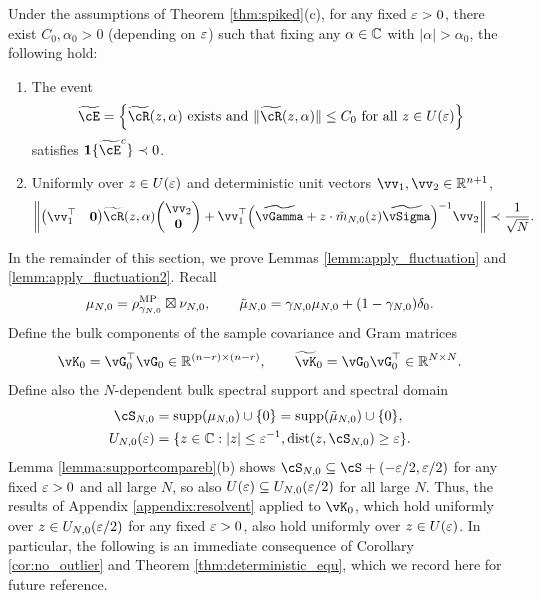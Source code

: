 \begin{lemma}\label{lemm:apply_fluctuation2}
Under the assumptions of Theorem \ref{thm:spiked}(c), for any fixed $\varepsilon>0$, there
exist $C_0,\alpha_0>0$ (depending on $\varepsilon$) such that fixing any $\alpha \in
\mathbb{C}$ with $|\alpha|>\alpha_0$, the following hold:
\begin{enumerate}[label=(\alph*)]
\item The event
\[\widetilde \cE=\Big\{\widetilde \vcR(z,\alpha) \text{ exists and } \|\widetilde \vcR(z,\alpha)\| \leq C_0
\text{ for all } z \in U(\eps)\Big\}\]
satisfies $\bI\{\widetilde \cE^c\} \prec 0$.
\item Uniformly over $z \in U(\varepsilon)$ and
deterministic unit vectors $\vv_1,\vv_2\in\R^{n+1}$,
\begin{align}
		\norm{   \begin{pmatrix}
			\vv_1^\top&\mathbf{0}
		\end{pmatrix}\widetilde \vcR(z,\alpha)\begin{pmatrix}
			\vv_2\\
			\mathbf{0}
		\end{pmatrix}+
\vv_1^\top \left(\widetilde\vGamma+z\cdot\tilde{m}_{N,0}(z)\widetilde\vSigma
\right)^{-1}\vv_2 } \prec \frac{1}{\sqrt{N}}.
\end{align}
\end{enumerate}
\end{lemma}

In the remainder of this section, we prove Lemmas \ref{lemm:apply_fluctuation}
and \ref{lemm:apply_fluctuation2}. Recall 
\[\mu_{N,0}=\rho_{\gamma_{N,0}}^{\textnormal{MP}} \boxtimes\nu_{N,0}, \qquad
\tilde \mu_{N,0}=\gamma_{N,0}\mu_{N,0}+(1-\gamma_{N,0})\delta_0.\]
Define the bulk components of the sample covariance and Gram matrices
\begin{equation}\label{eq:K0def}
\vK_0=\vG_0^\top \vG_0 \in \R^{(n-r) \times (n-r)},
\qquad \widetilde \vK_0=\vG_0\vG_0^\top \in \R^{N \times N}.
\end{equation}
Define also the $N$-dependent bulk spectral support and spectral domain
\begin{align}
\cS_{N,0}&=\supp{\mu_{N,0}} \cup \{0\}
=\supp{\tilde\mu_{N,0}} \cup \{0\},\nonumber\\
U_{N,0}(\eps)&=\{z \in \C:|z| \leq \eps^{-1},\dist{z,\cS_{N,0}} \geq \eps\}.\label{eq:UN0}
\end{align}
Lemma \ref{lemma:supportcompareb}(b) shows
$\cS_{N,0} \subseteq \cS+(-\eps/2,\eps/2)$ for any fixed $\varepsilon>0$ and all large $N$,
so also $U(\varepsilon) \subseteq U_{N,0}(\varepsilon/2)$ for all large $N$. Thus, the results of
Appendix \ref{appendix:resolvent} applied to $\vK_0$, which hold uniformly over
$z \in U_{N,0}(\varepsilon/2)$ for any fixed $\varepsilon>0$,
also hold uniformly over $z \in U(\varepsilon)$. In particular,
the following is an immediate consequence of Corollary \ref{cor:no_outlier} and
Theorem \ref{thm:deterministic_equ},
which we record here for future reference.

